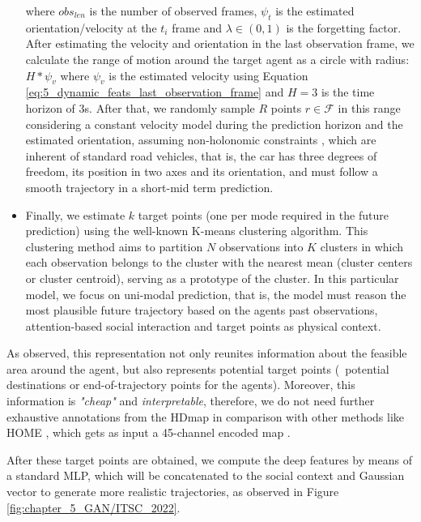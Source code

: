 \begin{itemize}
	where $obs_{len}$ is the number of observed frames, $\psi_t$ is the estimated orientation/velocity at the $t_{i}$ frame and $\lambda\in(0, 1)$ is the forgetting factor. After estimating the velocity and orientation in the last observation frame, we calculate the range of motion around the target agent as a circle with radius: $H * \psi_{v}$ where $\psi_{v}$ is the estimated velocity using Equation \ref{eq:5_dynamic_feats_last_observation_frame} and $H=3$ is the time horizon of 3s. After that, we randomly sample $R$ points $r \in \mathcal{F}$ in this range considering a constant velocity model during the prediction horizon and the estimated orientation, assuming non-holonomic constraints \cite{triggs1993motion}, which are inherent of standard road vehicles, that is, the car has three degrees of freedom, its position in two axes and its orientation, and must follow a smooth trajectory in a short-mid term prediction.
	
	\item Finally, we estimate $k$ target points (one per mode required in the future prediction) using the well-known K-means \cite{ahmed2020k} clustering algorithm. This clustering method aims to partition $N$ observations into $K$ clusters in which each observation belongs to the cluster with the nearest mean (cluster centers or cluster centroid), serving as a prototype of the cluster. In this particular model, we focus on uni-modal prediction, that is, the model must reason the most plausible future trajectory based on the agents past observations, attention-based social interaction and target points as physical context.
	
\end{itemize}
  
As observed, this representation not only reunites information about the feasible area around the agent, but also represents potential target points \cite{dendorfer2020goal} (\ie \ potential destinations or end-of-trajectory points for the agents). Moreover, this information is \textit{"cheap"} and \textit{interpretable}, therefore, we do not need further exhaustive annotations from the \ac{HDmap} in comparison with other methods like HOME \cite{gilles2021home}, which gets as input a 45-channel encoded map \cite{gilles2021home}.

After these target points are obtained, we compute the deep features by means of a standard \ac{MLP}, which will be concatenated to the social context and Gaussian vector to generate more realistic trajectories, as observed in Figure \ref{fig:chapter_5_GAN/ITSC_2022}.

